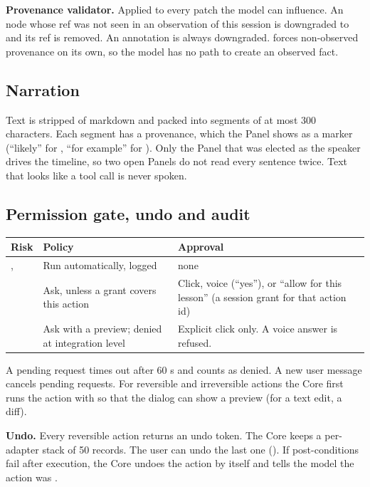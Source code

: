 \textbf{Provenance validator.} Applied to every patch the model can influence. An \pobs{} node whose ref was not seen in an observation of this session is downgraded to \pinf{} and its ref is removed. An \pobs{} annotation is always downgraded.  forces non-observed provenance on its own, so the model has no path to create an observed fact.

\subsection{Narration}

Text is stripped of markdown and packed into segments of at most 300 characters. Each segment has a provenance, which the Panel shows as a marker (``likely'' for \pinf, ``for example'' for \pill). Only the Panel that was elected as the speaker drives the timeline, so two open Panels do not read every sentence twice. Text that looks like a tool call is never spoken.

\subsection{Permission gate, undo and audit}\label{sec:gate}

\begin{xltabular}{\textwidth}{@{}L{2.8cm}L{4.6cm}Y@{}}
\toprule
\textbf{Risk} & \textbf{Policy} & \textbf{Approval} \\
\midrule
{},  & Run automatically, logged & none \\
 & Ask, unless a grant covers this action & Click, voice (``yes''), or ``allow for this lesson'' (a session grant for that action id) \\
 & Ask with a preview; denied at integration level  & Explicit click only. A voice answer is refused. \\
\bottomrule
\end{xltabular}

A pending request times out after 60 s and counts as denied. A new user message cancels pending requests. For reversible and irreversible actions the Core first runs the action with  so that the dialog can show a preview (for a text edit, a diff).

\textbf{Undo.} Every reversible action returns an undo token. The Core keeps a per-adapter stack of 50 records. The user can undo the last one (). If post-conditions fail after execution, the Core undoes the action by itself and tells the model the action was .

